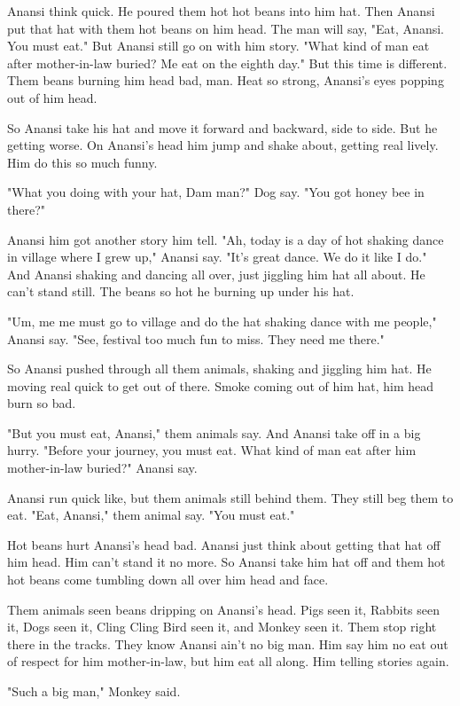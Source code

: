 Anansi think quick. He poured them hot hot beans into him hat. Then Anansi put that hat with them hot beans on him head. The man will say, "Eat, Anansi. You must eat." But Anansi still go on with him story. "What kind of man eat after mother-in-law buried? Me eat on the eighth day." But this time is different. Them beans burning him head bad, man. Heat so strong, Anansi's eyes popping out of him head.

So Anansi take his hat and move it forward and backward, side to side. But he getting worse. On Anansi's head him jump and shake about, getting real lively. Him do this so much funny.

"What you doing with your hat, Dam man?" Dog say. "You got honey bee in there?"

Anansi him got another story him tell. "Ah, today is a day of hot shaking dance in village where I grew up," Anansi say. "It's great dance. We do it like I do." And Anansi shaking and dancing all over, just jiggling him hat all about. He can't stand still. The beans so hot he burning up under his hat.

"Um, me me must go to village and do the hat shaking dance with me people," Anansi say. "See, festival too much fun to miss. They need me there."

So Anansi pushed through all them animals, shaking and jiggling him hat. He moving real quick to get out of there. Smoke coming out of him hat, him head burn so bad.

"But you must eat, Anansi," them animals say. And Anansi take off in a big hurry. "Before your journey, you must eat. What kind of man eat after him mother-in-law buried?" Anansi say.

Anansi run quick like, but them animals still behind them. They still beg them to eat. "Eat, Anansi," them animal say. "You must eat."

Hot beans hurt Anansi's head bad. Anansi just think about getting that hat off him head. Him can't stand it no more. So Anansi take him hat off and them hot hot beans come tumbling down all over him head and face.

Them animals seen beans dripping on Anansi's head. Pigs seen it, Rabbits seen it, Dogs seen it, Cling Cling Bird seen it, and Monkey seen it. Them stop right there in the tracks. They know Anansi ain't no big man. Him say him no eat out of respect for him mother-in-law, but him eat all along. Him telling stories again.

"Such a big man," Monkey said.

